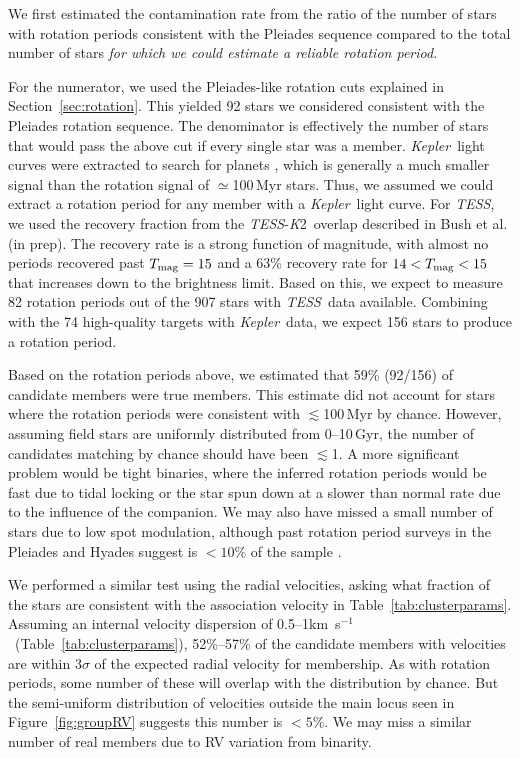 \documentclass[twocolumn, linenumbers]{aastex631}
\newcommand{\kepler}{{\it Kepler}}
\newcommand\kms{km~s$^{-1}$}
\newcommand{\tess}{\textit{TESS}}
\newcommand{\ktwo}{{\textit K2}}
\begin{document}
We first estimated the contamination rate from the ratio of the number of stars with rotation periods consistent with the Pleiades sequence compared to the total number of stars {\it for which we could estimate a reliable rotation period.} 

For the numerator, we used the Pleiades-like rotation cuts explained in Section~\ref{sec:rotation}. This yielded 92 stars we considered consistent with the Pleiades rotation sequence. The denominator is effectively the number of stars that would pass the above cut if every single star was a member. \kepler\ light curves were extracted to search for planets \citep{Jenkins:2010qy}, which is generally a much smaller signal than the rotation signal of $\simeq$100\,Myr stars. Thus, we assumed we could extract a rotation period for any member with a \kepler\ light curve. For \tess, we used the recovery fraction from the \tess-\ktwo\ overlap described in Bush et al. (in prep). The recovery rate is a strong function of magnitude, with almost no periods recovered past $T_{\rm{mag}}=15$ and a 63\% recovery rate for $14<T_{\rm{mag}}<15$ that increases down to the brightness limit. Based on this, we expect to measure 82 rotation periods out of the 907 stars with \tess\ data available. Combining with the 74 high-quality targets with \kepler\ data, we expect 156 stars to produce a rotation period.

Based on the rotation periods above, we estimated that 59\% (92/156) of candidate members were true members. This estimate did not account for stars where the rotation periods were consistent with $\lesssim$100\,Myr by chance. However, assuming field stars are uniformly distributed from 0--10\,Gyr, the number of candidates matching by chance should have been $\lesssim$1. A more significant problem would be tight binaries, where the inferred rotation periods would be fast due to tidal locking or the star spun down at a slower than normal rate due to the influence of the companion. We may also have missed a small number of stars due to low spot modulation, although past rotation period surveys in the Pleiades and Hyades suggest is $<10\%$ of the sample \citep[e.g.,][]{Rebull2016, Douglas2017, Douglas:2019}. 

We performed a similar test using the radial velocities, asking what fraction of the stars are consistent with the association velocity in Table~\ref{tab:clusterparams}. Assuming an internal velocity dispersion of 0.5--1\kms\ (Table~\ref{tab:clusterparams}), 52\%--57\% of the candidate members with velocities are within 3$\sigma$ of the expected radial velocity for membership. As with rotation periods, some number of these will overlap with the distribution by chance. But the semi-uniform distribution of velocities outside the main locus seen in Figure~\ref{fig:groupRV} suggests this number is $<5$\%. We may miss a similar number of real members due to RV variation from binarity. 
\end{document}
